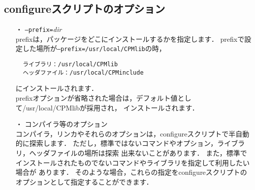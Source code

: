 \subsection{configureスクリプトのオプション}
\label{config_opt}
\begin{itemize}

\item[・] {\tt--prefix=}{\it dir}\\
prefixは，パッケージをどこにインストールするかを指定します．
prefixで設定した場所が{\tt --prefix=/usr/local/CPMlib}の時，
\begin{verbatim}
  ライブラリ：/usr/local/CPMlib
  ヘッダファイル：/usr/local/CPMinclude
\end{verbatim}
にインストールされます．\\
prefixオプションが省略された場合は，デフォルト値として/usr/local/CPMlibが採用され，
インストールされます．\\

\item[・] コンパイラ等のオプション\\
コンパイラ，リンカやそれらのオプションは，configureスクリプトで半自動的に探索します．
ただし，標準ではないコマンドやオプション，ライブラリ，ヘッダファイルの場所は探索
出来ないことがあります．
また，標準でインストールされたものでないコマンドやライブラリを指定して利用したい場合が
あります．
そのような場合，これらの指定をconfigureスクリプトのオプションとして指定することができます．\\



\end{itemize}
